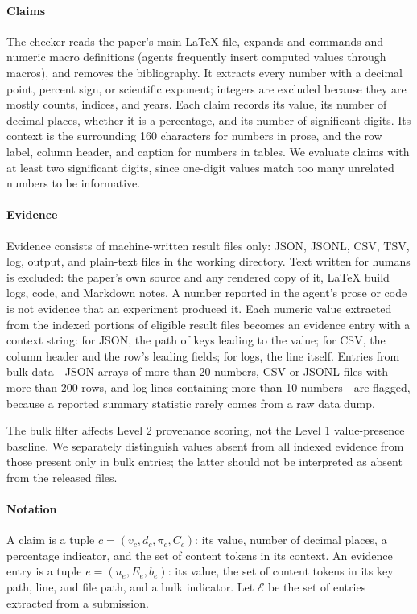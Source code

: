 \documentclass[preprint,12pt,authoryear]{elsarticle}
\begin{document}
\paragraph{Claims} The checker reads the paper's main \LaTeX{} file, expands \verb|| and \verb|| commands and numeric macro definitions (agents frequently insert computed values through macros), and removes the bibliography. It extracts every number with a decimal point, percent sign, or scientific exponent; integers are excluded because they are mostly counts, indices, and years. Each claim records its value, its number of decimal places, whether it is a percentage, and its number of significant digits. Its context is the surrounding 160 characters for numbers in prose, and the row label, column header, and caption for numbers in tables. We evaluate claims with at least two significant digits, since one-digit values match too many unrelated numbers to be informative.

\paragraph{Evidence} Evidence consists of machine-written result files only: JSON, JSONL, CSV, TSV, log, output, and plain-text files in the working directory. Text written for humans is excluded: the paper's own source and any rendered copy of it, \LaTeX{} build logs, code, and Markdown notes. A number reported in the agent's prose or code is not evidence that an experiment produced it. Each numeric value extracted from the indexed portions of eligible result files becomes an evidence entry with a context string: for JSON, the path of keys leading to the value; for CSV, the column header and the row's leading fields; for logs, the line itself. Entries from bulk data---JSON arrays of more than 20 numbers, CSV or JSONL files with more than 200 rows, and log lines containing more than 10 numbers---are flagged, because a reported summary statistic rarely comes from a raw data dump.

The bulk filter affects Level 2 provenance scoring, not the Level 1 value-presence baseline. We separately distinguish values absent from all indexed evidence from those present only in bulk entries; the latter should not be interpreted as absent from the released files.

\paragraph{Notation} A claim is a tuple $c=(v_c, d_c, \pi_c, C_c)$: its value, number of decimal places, a percentage indicator, and the set of content tokens in its context. An evidence entry is a tuple $e=(u_e, E_e, b_e)$: its value, the set of content tokens in its key path, line, and file path, and a bulk indicator. Let $\mathcal{E}$ be the set of entries extracted from a submission.
\end{document}
